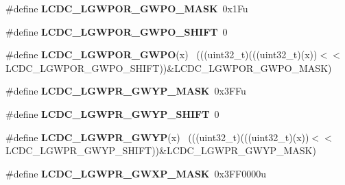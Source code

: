 \begin{DoxyCompactItemize}
\item 
\hypertarget{group___l_c_d_c___register___masks_ga21da45b9d1cd05c71ffb688074c2e00f}{}\#define {\bfseries L\+C\+D\+C\+\_\+\+L\+G\+W\+P\+O\+R\+\_\+\+G\+W\+P\+O\+\_\+\+M\+A\+S\+K}~0x1\+Fu\label{group___l_c_d_c___register___masks_ga21da45b9d1cd05c71ffb688074c2e00f}

\item 
\hypertarget{group___l_c_d_c___register___masks_ga3191e2dbd79ebb3f4ade24011964a2d1}{}\#define {\bfseries L\+C\+D\+C\+\_\+\+L\+G\+W\+P\+O\+R\+\_\+\+G\+W\+P\+O\+\_\+\+S\+H\+I\+F\+T}~0\label{group___l_c_d_c___register___masks_ga3191e2dbd79ebb3f4ade24011964a2d1}

\item 
\hypertarget{group___l_c_d_c___register___masks_gafc041f6a773c81442dce97764963d4a8}{}\#define {\bfseries L\+C\+D\+C\+\_\+\+L\+G\+W\+P\+O\+R\+\_\+\+G\+W\+P\+O}(x)                                        ~(((uint32\+\_\+t)(((uint32\+\_\+t)(x))$<$$<$L\+C\+D\+C\+\_\+\+L\+G\+W\+P\+O\+R\+\_\+\+G\+W\+P\+O\+\_\+\+S\+H\+I\+F\+T))\&L\+C\+D\+C\+\_\+\+L\+G\+W\+P\+O\+R\+\_\+\+G\+W\+P\+O\+\_\+\+M\+A\+S\+K)\label{group___l_c_d_c___register___masks_gafc041f6a773c81442dce97764963d4a8}

\item 
\hypertarget{group___l_c_d_c___register___masks_gacd12be0a3d4d026d6aaf0ae7d7b5d2eb}{}\#define {\bfseries L\+C\+D\+C\+\_\+\+L\+G\+W\+P\+R\+\_\+\+G\+W\+Y\+P\+\_\+\+M\+A\+S\+K}~0x3\+F\+Fu\label{group___l_c_d_c___register___masks_gacd12be0a3d4d026d6aaf0ae7d7b5d2eb}

\item 
\hypertarget{group___l_c_d_c___register___masks_gaa49213d554455b9ad37a33df4419dbc0}{}\#define {\bfseries L\+C\+D\+C\+\_\+\+L\+G\+W\+P\+R\+\_\+\+G\+W\+Y\+P\+\_\+\+S\+H\+I\+F\+T}~0\label{group___l_c_d_c___register___masks_gaa49213d554455b9ad37a33df4419dbc0}

\item 
\hypertarget{group___l_c_d_c___register___masks_gadcfe253e0a2878caa6920af2702b2fdd}{}\#define {\bfseries L\+C\+D\+C\+\_\+\+L\+G\+W\+P\+R\+\_\+\+G\+W\+Y\+P}(x)                                          ~(((uint32\+\_\+t)(((uint32\+\_\+t)(x))$<$$<$L\+C\+D\+C\+\_\+\+L\+G\+W\+P\+R\+\_\+\+G\+W\+Y\+P\+\_\+\+S\+H\+I\+F\+T))\&L\+C\+D\+C\+\_\+\+L\+G\+W\+P\+R\+\_\+\+G\+W\+Y\+P\+\_\+\+M\+A\+S\+K)\label{group___l_c_d_c___register___masks_gadcfe253e0a2878caa6920af2702b2fdd}

\item 
\hypertarget{group___l_c_d_c___register___masks_ga9d01940954d7f5a4247d609339f8fbb6}{}\#define {\bfseries L\+C\+D\+C\+\_\+\+L\+G\+W\+P\+R\+\_\+\+G\+W\+X\+P\+\_\+\+M\+A\+S\+K}~0x3\+F\+F0000u\label{group___l_c_d_c___register___masks_ga9d01940954d7f5a4247d609339f8fbb6}


\end{DoxyCompactItemize}
